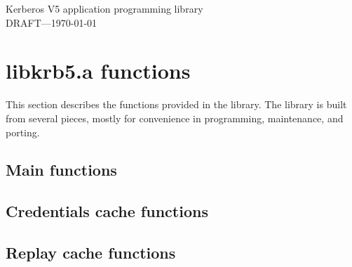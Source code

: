 \setlength{\oddsidemargin}{0in}
\setlength{\evensidemargin}{1.00in}
\setlength{\marginparsep}{0.05in}
\setlength{\marginparwidth}{1in}
\setlength{\textwidth}{5.75in}
\setlength{\topmargin}{-.5in}
\setlength{\textheight}{9in}
\setlength{\parskip}{.1in}
\setlength{\parindent}{2em}
\setlength{\footrulewidth}{0.4pt}
\setlength{\plainfootrulewidth}{0.4pt}
\setlength{\plainheadrulewidth}{0.4pt}
\makeindex
\newif\ifdraft
\drafttrue
%
%
\ifdraft
\pagestyle{fancyplain}
\addtolength{\headwidth}{\marginparsep}
\addtolength{\headwidth}{\marginparwidth}
\makeatletter
\renewcommand{\sectionmark}[1]{\markboth {\uppercase{\ifnum \c@secnumdepth >\z@
    \thesection\hskip 1em\relax \fi #1}}{}}%
\renewcommand{\subsectionmark}[1]{\markright {\ifnum \c@secnumdepth >\@ne
          \thesubsection\hskip 1em\relax \fi #1}}
\makeatother
\lhead[\thepage]{\fancyplain{}{\sl\rightmark}}
\rhead[\fancyplain{}{\sl\rightmark}]{\thepage}
\cfoot{\thepage}
\else\pagestyle{headings}\fi

\thispagestyle{empty}
\begin{center}
{\Huge Kerberos V5 application programming library}
\ifdraft \\ {\Large DRAFT---\today}\fi
\end{center}
\section{libkrb5.a functions}
This section describes the functions provided in the 
library.  The library is built from several pieces, mostly for convenience in
programming, maintenance, and porting.

\ifdraft\sloppy\fi

\subsection{Main functions}


\subsection{Credentials cache functions}


\subsection{Replay cache functions}


